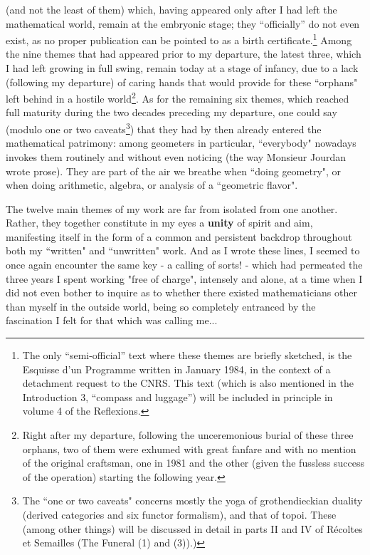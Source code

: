 (and not the least of them) which, having appeared only after I had left the mathematical world,
remain at the embryonic stage; they ``officially'' do not even exist, as no proper publication can
be pointed to as a birth certificate.\footnote{The only ``semi-official'' text where these
themes are briefly sketched, is the Esquisse d'un Programme written in January 1984, in
the context of a detachment request to the CNRS. This text (which is also mentioned in the
Introduction 3, ``compass and luggage'')
will be included in principle in volume 4 of the Reflexions.} Among the nine themes that had appeared prior to my departure, the latest three, which I had left growing in full swing, remain today at a stage of infancy, due to a lack (following my departure) of caring hands that would provide for these ``orphans" left behind in a hostile world\footnote{Right after my departure, following the unceremonious burial of these three orphans, two of them were exhumed with great fanfare and with no mention of the original craftsman, one in 1981 and the other (given the fussless success of the operation) starting the following year.}. As for the remaining six themes, which reached full maturity during the two decades preceding my departure, one could say (modulo one or two caveats\footnote{The ``one or two caveats" concerns mostly the yoga of grothendieckian duality (derived categories and six functor formalism), and that of topoi. These (among other things) will be discussed in detail in parts II and IV of Récoltes et Semailles (The Funeral (1) and (3)).)}) 
that they had by then already entered the mathematical patrimony: among geometers in particular, ``everybody" nowadays invokes them routinely and without even noticing (the way Monsieur Jourdan wrote prose). They are part of the air we breathe when ``doing geometry", or when doing arithmetic, algebra, or analysis of a ``geometric flavor".

 The twelve main themes of my work are far from isolated from one another. Rather, they together constitute in my eyes a \textbf{unity} of spirit and aim, manifesting itself in the form of a common and persistent backdrop throughout both my ``written" and ``unwritten" work. And as I wrote these lines, I seemed to once again encounter the same key - a calling of sorts! - which had permeated the three years I spent working "free of charge", intensely and alone, at a time when I did not even bother to inquire as to whether there existed mathematicians other than myself in the outside world, being so completely entranced by the fascination I felt for that which was calling me...

